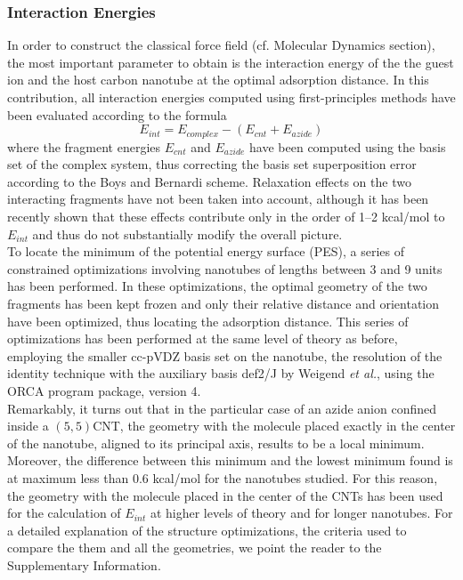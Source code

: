 \documentclass[utf8]{article}
\begin{document}
\subsubsection{Interaction Energies}
In order to construct the classical force field (cf. Molecular Dynamics section), the most important parameter to obtain is the interaction energy of the the guest \ntm ion and the host carbon nanotube at the optimal adsorption distance.
In this contribution, all interaction energies computed using first-principles methods have been evaluated according to the formula
%
\begin{equation}
    E_{int} = E_{complex} - (E_{cnt} + E_{azide}) \label{eq:eint}
\end{equation}
%
where the fragment energies $E_{cnt}$ and $E_{azide}$ have been computed using the basis set of the complex system, thus correcting the basis set superposition error according to the Boys and Bernardi scheme\cite{Boys1970}.
Relaxation effects on the two interacting fragments have not been taken into account, although it has been recently shown that these effects contribute only in the order of 1--2 kcal/mol\cite{Battaglia2017a} to $E_{int}$ and thus do not substantially modify the overall picture.\\
To locate the minimum of the potential energy surface (PES), a series of constrained optimizations involving nanotubes of lengths between 3 and 9 units has been performed. In these optimizations, the optimal geometry of the two fragments has been kept frozen and only their relative distance and orientation have been optimized, thus locating the adsorption distance.
This series of optimizations has been performed at the same level of theory as before, employing the smaller cc-pVDZ basis set on the nanotube, the resolution of the identity technique with the auxiliary basis def2/J by Weigend \textit{et al.}\cite{Weigend2006}, using the ORCA program package, version 4\cite{ORCA}.\\
Remarkably, it turns out that in the particular case of an azide anion confined inside a $(5,5)$CNT, the geometry with the \ntm molecule placed exactly in the center of the nanotube, aligned to its principal axis, results to be a local minimum. Moreover, the difference between this minimum and the lowest minimum found is at maximum less than $0.6$ kcal/mol for the nanotubes studied. For this reason, the geometry with the \ntm molecule placed in the center of the CNTs has been used for the calculation of $E_{int}$ at higher levels of theory and for longer nanotubes.
For a detailed explanation of the structure optimizations, the criteria used to compare the them and all the geometries, we point the reader to the Supplementary Information.\\
\end{document}
